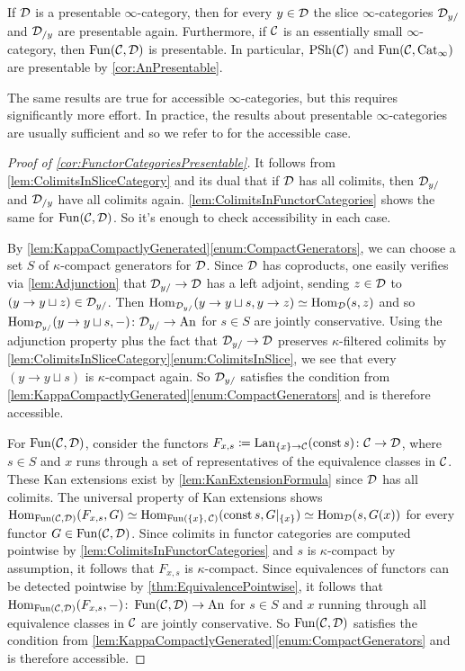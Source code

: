 \begin{cor}\label{cor:FunctorCategoriesPresentable}
	If $\mathcal{D}$ is a presentable $\infty$-category, then for every $y\in\mathcal{D}$ the slice $\infty$-categories $\mathcal{D}_{y/}$ and $\mathcal{D}_{/y}$ are presentable again. Furthermore, if $\mathcal{C}$ is an essentially small $\infty$-category, then $\operatorname{Fun}(\mathcal{C},\mathcal{D})$ is presentable. In particular, $\operatorname{PSh}(\mathcal{C})$ and $\operatorname{Fun}(\mathcal{C},\mathrm{Cat}_\infty)$ are presentable by \cref{cor:AnPresentable}.
\end{cor}
The same results are true for accessible $\infty$-categories, but this requires significantly more effort. In practice, the results about presentable $\infty$-categories are usually sufficient and so we refer to \cite[\S\href{https://people.math.harvard.edu/~lurie/papers/HTT.pdf\#section.5.4}{5.4}]{HTT} for the accessible case.
\begin{proof}[Proof of \cref{cor:FunctorCategoriesPresentable}]
	It follows from \cref{lem:ColimitsInSliceCategory} and its dual that if $\mathcal{D}$ has all colimits, then $\mathcal{D}_{y/}$ and $\mathcal{D}_{/y}$ have all colimits again. \cref{lem:ColimitsInFunctorCategories} shows the same for $\operatorname{Fun}(\mathcal{C},\mathcal{D})$. So it's enough to check accessibility in each case.
	
	By \cref{lem:KappaCompactlyGenerated}\cref{enum:CompactGenerators}, we can choose a set $S$ of $\kappa$-compact generators for $\mathcal{D}$. Since $\mathcal{D}$ has coproducts, one easily verifies via \cref{lem:Adjunction} that $\mathcal{D}_{y/}\rightarrow\mathcal{D}$ has a left adjoint, sending $z\in\mathcal{D}$ to $(y\rightarrow y\sqcup z)\in\mathcal{D}_{y/}$. Then $\operatorname{Hom}_{\mathcal{D}_{y/}}(y\rightarrow y\sqcup s,y\rightarrow z)\simeq \operatorname{Hom}_{\mathcal{D}}(s,z)$ and so $\operatorname{Hom}_{\mathcal{D}_{y/}}(y\rightarrow y\sqcup s,-)\colon \mathcal{D}_{y/}\rightarrow\mathrm{An}$ for $s\in S$ are jointly conservative. Using the adjunction property plus the fact that $\mathcal{D}_{y/}\rightarrow \mathcal{D}$ preserves $\kappa$-filtered colimits by \cref{lem:ColimitsInSliceCategory}\cref{enum:ColimitsInSlice}, we see that every $(y\rightarrow y\sqcup s)$ is $\kappa$-compact again. So $\mathcal{D}_{y/}$ satisfies the condition from \cref{lem:KappaCompactlyGenerated}\cref{enum:CompactGenerators} and is therefore accessible.
	
	For $\operatorname{Fun}(\mathcal{C},\mathcal{D})$, consider the functors $F_{x,s}\coloneqq\operatorname{Lan}_{\{x\}\rightarrow \mathcal{C}}(\operatorname{const} s)\colon \mathcal{C}\rightarrow\mathcal{D}$, where $s\in S$ and $x$ runs through a set of representatives of the equivalence classes in $\mathcal{C}$. These Kan extensions exist by \cref{lem:KanExtensionFormula} since $\mathcal{D}$ has all colimits. The universal property of Kan extensions shows $\operatorname{Hom}_{\operatorname{Fun}(\mathcal{C},\mathcal{D})}(F_{x,s},G)\simeq \operatorname{Hom}_{\operatorname{Fun}(\{x\},\,\mathcal{C})}(\operatorname{const} s,G|_{\{x\}})\simeq \operatorname{Hom}_{\mathcal{D}}(s,G(x))$ for every functor $G\in\operatorname{Fun}(\mathcal{C},\mathcal{D})$. Since colimits in functor categories are computed pointwise by \cref{lem:ColimitsInFunctorCategories} and $s$ is $\kappa$-compact by assumption, it follows that $F_{x,s}$ is $\kappa$-compact. Since equivalences of functors can be detected pointwise by \cref{thm:EquivalencePointwise}, it follows that $\operatorname{Hom}_{\operatorname{Fun}(\mathcal{C},\mathcal{D})}(F_{x,s},-)\colon \operatorname{Fun}(\mathcal{C},\mathcal{D})\rightarrow\mathrm{An}$ for $s\in S$ and $x$ running through all equivalence classes in $\mathcal{C}$ are jointly conservative. So $\operatorname{Fun}(\mathcal{C},\mathcal{D})$ satisfies the condition from \cref{lem:KappaCompactlyGenerated}\cref{enum:CompactGenerators} and is therefore accessible.
	

\end{proof}
